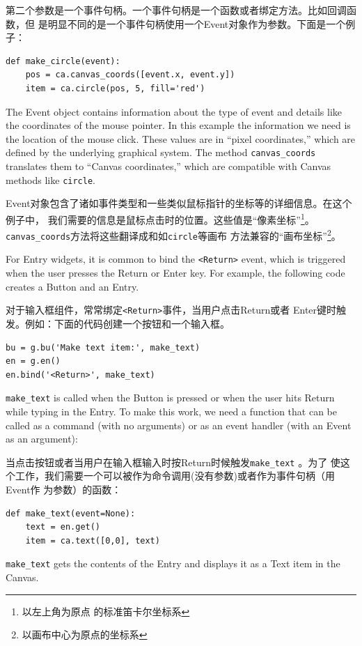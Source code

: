\documentclass[10pt]{book}
\begin{document}
\begin{CJK}{UTF8}{gbsn}
第二个参数是一个事件句柄。一个事件句柄是一个函数或者绑定方法。比如回调函数，但
是明显不同的是一个事件句柄使用一个Event对象作为参数。下面是一个例子：

\begin{verbatim}
def make_circle(event):
    pos = ca.canvas_coords([event.x, event.y])
    item = ca.circle(pos, 5, fill='red')
\end{verbatim}
%
The Event object contains information about the type of event and
details like the coordinates of the mouse pointer.  In this example
the information we need is
the location of the mouse click.  These
values are in ``pixel coordinates,'' which are defined by the
underlying graphical system.  The method \verb"canvas_coords"
translates them to ``Canvas coordinates,'' which are compatible with
Canvas methods like {\tt circle}.

Event对象包含了诸如事件类型和一些类似鼠标指针的坐标等的详细信息。在这个例子中，
我们需要的信息是鼠标点击时的位置。这些值是``像素坐标''\footnote{以左上角为原点
的标准笛卡尔坐标系}。\verb"canvas_coords"方法将这些翻译成和如{\tt circle}等画布
方法兼容的``画布坐标''\footnote{以画布中心为原点的坐标系}。

For Entry widgets, it is common to bind the \verb"<Return>" event,
which is triggered when the user presses the {\sf Return} or
{\sf Enter} key.  For example, the following code creates a Button
and an Entry.

对于输入框组件，常常绑定\verb"<Return>"事件，当用户点击{\sf Return}或者{\sf
Enter}键时触发。例如：下面的代码创建一个按钮和一个输入框。

\begin{verbatim}
bu = g.bu('Make text item:', make_text)
en = g.en()
en.bind('<Return>', make_text)
\end{verbatim}
%
\verb"make_text" is called when the Button is pressed or when
the user hits {\sf Return} while typing in the Entry.  To make
this work, we need a function that can be called as a command
(with no arguments) or as an event handler (with an Event
as an argument):

当点击按钮或者当用户在输入框输入时按{\sf Return}时候触发\verb"make_text" 。为了
使这个工作，我们需要一个可以被作为命令调用(没有参数)或者作为事件句柄（用Event作
为参数）的函数：

\begin{verbatim}
def make_text(event=None):
    text = en.get()
    item = ca.text([0,0], text)
\end{verbatim}
%
\verb"make_text" gets the contents of the Entry and displays
it as a Text item in the Canvas.


\end{CJK}
\end{document}
